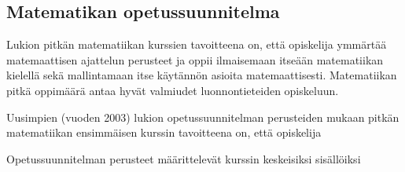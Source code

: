 \subsection*{Matematikan opetussuunnitelma}

Lukion pitkän matematiikan kurssien tavoitteena on, että opiskelija ymmärtää matemaattisen ajattelun perusteet ja oppii ilmaisemaan itseään matematiikan kielellä sekä mallintamaan itse käytännön asioita matemaattisesti. Matematiikan pitkä oppimäärä antaa hyvät valmiudet luonnontieteiden opiskeluun.

Uusimpien (vuoden 2003) lukion opetussuunnitelman perusteiden mukaan pitkän matematiikan ensimmäisen kurssin tavoitteena on, että opiskelija

Opetussuunnitelman perusteet määrittelevät kurssin keskeisiksi sisällöiksi


\newpage

